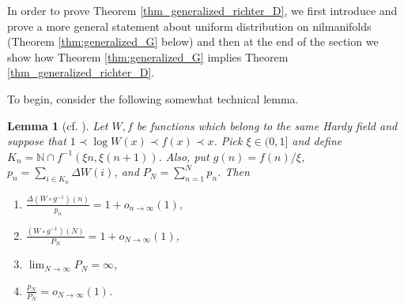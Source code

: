 \documentclass[12pt]{article}
\theoremstyle{plain} %
\newtheorem{lemma}[theorem]{Lemma}
\theoremstyle{definition} %
\theoremstyle{plain}
\theoremstyle{plain}
\numberwithin{equation}{section}
\newcommand{\N}{\mathbb{N}}
\newcommand{\1}{\mathbbm{1}}
\newcommand{\oo}{\infty}
\begin{document}
In order to prove Theorem \ref{thm_generalized_richter_D}, we first introduce and prove a more general statement about uniform distribution on nilmanifolds (Theorem \ref{thm:generalized_G} below) and then at the end of the section we show how Theorem \ref{thm:generalized_G} implies Theorem \ref{thm_generalized_richter_D}.



 To begin, consider the following somewhat technical lemma.

 \begin{lemma}[cf. {\cite[Lemma 6.4]{Richter23}}]\label{lem:replace_richter_6.4}
     Let $W,f$ be functions which belong to the same Hardy field and suppose that $1\prec \log W(x)\prec f(x)\prec x$. Pick $\xi \in (0,1]$ and define $K_n = \N\cap f^{-1}(\xi n, \xi (n+1))$. Also, put $g(n) = f(n)/\xi$, $p_n = \sum_{i\in K_n}\Delta W(i)$, and $P_N = \sum_{n=1}^Np_n$. Then
     \begin{enumerate}[label = (\roman*)]
         \item $\frac{\Delta (W\circ g^{-1})(n)}{p_n}= 1 +o_{n\to\oo}(1)$,  
         \item $\frac{(W\circ g^{-1})(N)}{P_N}= 1 +o_{N\to\oo}(1)$, 
         \item $\lim_{N\to\oo}P_N=\oo$, 
         \item $\frac{p_N}{P_N}=o_{N\to\oo}(1)$.
     \end{enumerate}
 \end{lemma}
\end{document}
